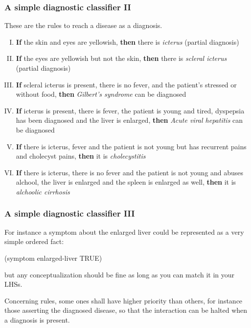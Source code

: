 \documentclass[xcolor={usenames,dvipsnames,svgnames}, compress]{beamer}
\begin{document}
\begin{frame}
  \frametitle{A simple diagnostic classifier II}
  These are the rules to reach a disease as a diagnosis.
  \begin{enumerate}[I.]
  \item \textbf{If} the skin and eyes are yellowish, \textbf{then}
    there is \emph{icterus} (partial diagnosis)
    \item  \textbf{If} the eyes are yellowish but not the skin, \textbf{then} there is
      \emph{scleral icterus} (partial diagnosis)
  \item \textbf{If} scleral icterus is present, there is no fever, and the
  patient's stressed or without food, \textbf{then} \emph{Gilbert's syndrome} can be
  diagnosed
  \item  \textbf{If} icterus is present, there is fever, the patient is young
    and tired, dyspepsia has been diagnosed and the liver is enlarged,
    \textbf{then} \emph{Acute viral hepatitis} can be diagnosed
  \item  \textbf{If} there is icterus, fever and the patient is not young but
    has recurrent pains and cholecyst pains, \textbf{then} it is  \emph{cholecystitis}
  \item \textbf{If} there is icterus, there is no fever and the patient is not
    young and abuses alchool, the liver is enlarged and the spleen is
    enlarged as well, \textbf{then} it is \emph{alchoolic cirrhosis}
   \end{enumerate}
\end{frame}


\begin{frame}[fragile]
  \frametitle{A simple diagnostic classifier III}
  For instance a symptom about the enlarged liver could be represented
  as a very simple ordered fact:
  \begin{clips-code}[numbers=none]
    (symptom enlarged-liver TRUE)
  \end{clips-code}
  but any conceptualization should be fine as long as you can match it
  in your LHSs.\par\bigskip

  Concerning rules, some ones shall have higher priority than others,
  for instance those asserting the diagnosed disease, so that the
  interaction can be halted when a diagnosis is present.
\end{frame}
\end{document}
